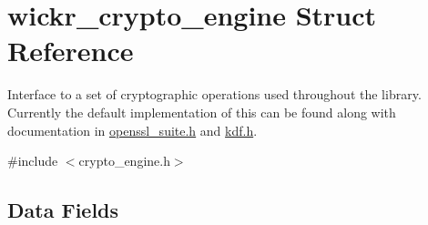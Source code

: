 \hypertarget{structwickr__crypto__engine}{}\section{wickr\+\_\+crypto\+\_\+engine Struct Reference}
\label{structwickr__crypto__engine}


Interface to a set of cryptographic operations used throughout the library. Currently the default implementation of this can be found along with documentation in \hyperlink{openssl__suite_8h_source}{openssl\+\_\+suite.\+h} and \hyperlink{kdf_8h_source}{kdf.\+h}.  




{\ttfamily \#include $<$crypto\+\_\+engine.\+h$>$}

\subsection*{Data Fields}
